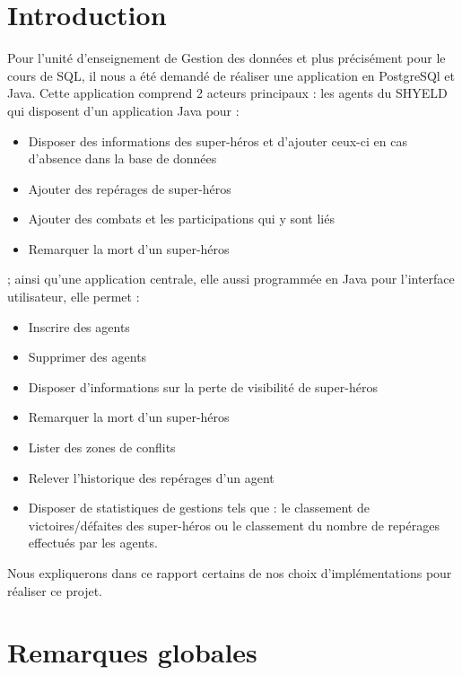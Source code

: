 \documentclass{article}[12pt]
\begin{document}
	
	
	
	\tableofcontents%
	\newpage
	
	
	\section{Introduction}
	Pour l'unité d'enseignement de Gestion des données et plus précisément pour le cours de SQL, il nous a été demandé de réaliser une application en PostgreSQl et Java. Cette application comprend 2 acteurs principaux : les agents du SHYELD qui disposent d'un application Java pour :
	\begin{itemize}
		\item Disposer des informations des super-héros et d'ajouter ceux-ci en cas d'absence dans la base de données
		\item Ajouter des repérages de super-héros
		\item Ajouter des combats et les participations qui y sont liés
		\item Remarquer la mort d'un super-héros
	\end{itemize}
	; ainsi qu'une application centrale, elle aussi programmée en Java pour l'interface utilisateur, elle permet :
	\begin{itemize}
		\item Inscrire des agents
		\item Supprimer des agents
		\item Disposer d'informations sur la perte de visibilité de super-héros
		\item Remarquer la mort d'un super-héros
		\item Lister des zones de conflits
		\item Relever l'historique des repérages d'un agent
		\item Disposer de statistiques de gestions tels que : le classement de victoires/défaites des super-héros ou le classement du nombre de repérages effectués par les agents.
	\end{itemize}
	Nous expliquerons dans ce rapport certains de nos choix d'implémentations pour réaliser ce projet.
	\section{Remarques globales}
\end{document}
